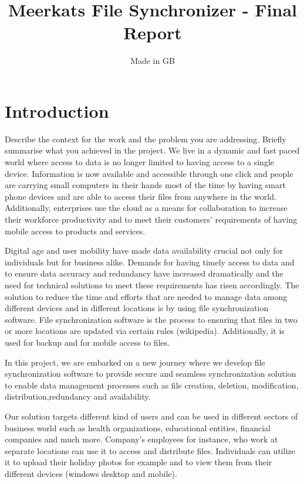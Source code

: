 \documentclass{article}
\title{Meerkats File Synchronizer - Final Report}
\author{Made in GB}
\date{}
\begin{document}
\maketitle{}

\section{Introduction}
Describe the context for the work and the problem you are addressing. Briefly summarise what you achieved in the project. \vfill
\vspace{5mm}
We live in a dynamic and fast paced world where access to data is no longer limited to having access to a single device. Information is now available and accessible through one click and people are carrying small computers in their hands most of the time by having smart phone devices and are able to access their files from anywhere in the world. Additionally, enterprises use the cloud as a means for collaboration to increase their workforce productivity and to meet their customers’ requirements of having mobile access to products and services.

Digital age and user mobility have made data availability crucial not only for individuals but for business alike. Demands for having timely access to data and to ensure data accuracy and redundancy have increased dramatically and the need for technical solutions to meet these requirements has risen accordingly. The solution to reduce the time and efforts that are needed to manage data among different devices and in different locations is by using file synchronization software. File synchronization software is the process to ensuring that files in two or more locations are updated via certain rules (wikipedia). Additionally, it is used for backup and for mobile access to files.

\newline
\hfill \break
In this project, we are embarked on a new journey where we develop file synchronization software to provide secure and seamless synchronization solution to enable data management processes such as file creation, deletion, modification, distribution,redundancy and availability.

Our solution targets different kind of users and can be used in different sectors of business world such as health organizations, educational entities, financial companies and much more. Company’s employees for instance, who work at separate locations can use it to access and distribute files. Individuals can utilize it to upload their holiday photos for example and to view them from their different devices (windows desktop and mobile).
\end{document}
